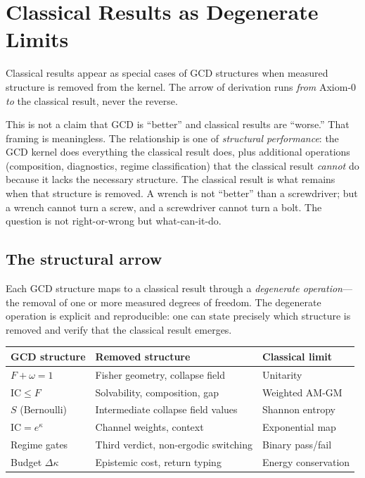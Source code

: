 \documentclass[
  aps,
  prd,
  twocolumn,
  superscriptaddress,
  nofootinbib,
  floatfix
]{revtex4-2}
\newcommand{\IC}{\mathrm{IC}}
\begin{document}
\section{Classical Results as Degenerate Limits}
\label{sec:degenerate}

Classical results appear as special cases of GCD structures when
measured structure is removed from the kernel.  The arrow of
derivation runs \emph{from} Axiom-0 \emph{to} the classical
result, never the reverse.

This is not a claim that GCD is ``better'' and classical
results are ``worse.''  That framing is meaningless.  The
relationship is one of \emph{structural performance}: the GCD
kernel does everything the classical result does, plus additional
operations (composition, diagnostics, regime classification)
that the classical result \emph{cannot} do because it lacks the
necessary structure.  The classical result is what remains when
that structure is removed.  A wrench is not ``better'' than a
screwdriver; but a wrench cannot turn a screw, and a screwdriver
cannot turn a bolt.  The question is not right-or-wrong but
what-can-it-do.

\subsection{The structural arrow}

Each GCD structure maps to a classical result through a
\emph{degenerate operation}---the removal of one or more
measured degrees of freedom.  The degenerate operation is
explicit and reproducible: one can state precisely which
structure is removed and verify that the classical result
emerges.

\begin{center}
{\small\begin{tabular}{@{}lp{2.5cm}l@{}}
\toprule
\textbf{GCD structure} & \textbf{Removed structure} & \textbf{Classical limit} \\
\midrule
$F + \omega = 1$ & Fisher geometry, collapse field & Unitarity \\
$\IC \leq F$ & Solvability, composition, gap & Weighted AM-GM \\
$S$ (Bernoulli) & Intermediate collapse field values & Shannon entropy \\
$\IC = e^\kappa$ & Channel weights, context & Exponential map \\
Regime gates & Third verdict, non-ergodic switching & Binary pass/fail \\
Budget $\Delta\kappa$ & Epistemic cost, return typing & Energy conservation \\
\bottomrule
\end{tabular}}
\end{center}
\end{document}
